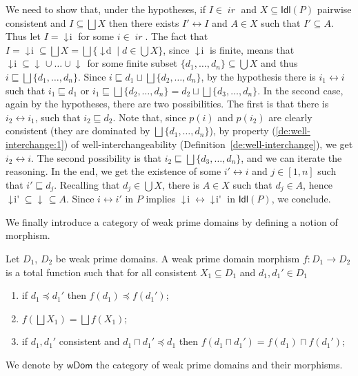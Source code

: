 \documentclass[conference]{IEEEtran}
\renewenvironment{proof}{\begin{IEEEproof}}{\end{IEEEproof}}
\newcommand{\principal}[1]{\ensuremath{\mathop{\downarrow\!{#1}}}}
\newcommand{\ideal}[1]{\ensuremath{\mathsf{Idl}({#1})}}
\newcommand{\ir}[1]{\ensuremath{\mathop{\mathit{ir}({#1})}}}
\newcommand{\pred}[1]{\ensuremath{\mathit{p}({#1})}}
\newcommand{\WDom}{\ensuremath{\mathsf{wDom}}}
\newcommand{\interval}[2][1]{\ensuremath{[{#1},{#2}]}}
\begin{document}
\begin{proof}
  
  We need to show that, under the hypotheses, if
  $I \in \ir{\ideal{P}}$ and $X \subseteq \ideal{P}$ pairwise
  consistent and $I \subseteq \bigsqcup X$ then there exists
  $I' \leftrightarrow I$ and $A \in X$ such that $I' \subseteq
  A$. Thus let $I = \principal{i}$ for some $i \in \ir{P}$. The fact
  that
  $I = \principal{i} \subseteq \bigsqcup X = \bigsqcup \{
  \principal{d} \mid d \in \bigcup X \}$, since $\principal{i}$ is
  finite, means that
  $\principal{i} \subseteq \principal{d_1} \cup \ldots \cup
  \principal{d_n}$ for some finite subset
  $\{ d_1, \ldots, d_n \} \subseteq \bigcup X$ and thus
  $i \sqsubseteq \bigsqcup \{ d_1, \ldots, d_n \}$. Since
  $i \sqsubseteq d_1 \sqcup \bigsqcup \{ d_2, \ldots, d_n\}$, by the
  hypothesis there is $i_1 \leftrightarrow i$ such that
  $i_1 \sqsubseteq d_1$ or
  $i_1 \sqsubseteq \bigsqcup \{ d_2, \ldots, d_n\} = d_2 \sqcup
  \bigsqcup \{ d_3, \ldots, d_n\}$.
  In the second case, again by the hypotheses, there are two
  possibilities. The first is that there is $i_2 \leftrightarrow i_1$,
  such that $i_2 \sqsubseteq d_2$. Note that, since $\pred{i}$ and
  $\pred{i_2}$ are clearly consistent (they are dominated by
  $\bigsqcup \{ d_1, \ldots, d_n \}$), by property
  (\ref{de:well-interchange:1}) of well-interchangeability
  (Definition~\ref{de:well-interchange}), we get
  $i_2 \leftrightarrow i$.
  The second possibility is that
  ${i_2} \sqsubseteq \bigsqcup \{ d_3, \ldots, d_n\}$, and we can iterate the reasoning. 
  In the end, we get the existence of some
  $i' \leftrightarrow i$ and $j \in \interval{n}$ such that
  $i' \sqsubseteq d_j$. Recalling that $d_j \in \bigcup X$, there is
  ${A} \in X$ such that $d_j \in {A}$, hence
  $\principal{{i'}} \subseteq \principal{d_j} \subseteq
  {A}$. Since $i \leftrightarrow {i'}$ in $P$ implies
    $\principal{i} \leftrightarrow \principal{{i'}}$ in $\ideal{P}$,
    we conclude.
\end{proof}



We finally introduce a category of weak prime domains by defining a notion of morphism.

\begin{definition}
  \label{de:domain-category}
  Let $D_1$, $D_2$ be weak prime domains.
  A  weak prime domain morphism $f : D_1 \to D_2$ is a total function such that
  for all consistent $X_1 \subseteq D_1$ and $d_1, d_1' \in D_1$
  \begin{enumerate}
  \item if $d_1 \preceq d_1'$ then $f(d_1) \preceq f(d_1')$;
  \item $f(\bigsqcup X_1) = \bigsqcup f(X_1)$;
  \item if $d_1, d_1'$ consistent and
    $d_1 \sqcap d_1' \preceq d_1$ then
    $f(d_1 \sqcap d_1') = f(d_1) \sqcap f(d_1')$;
  \end{enumerate}
  We denote by $\WDom$ the category of weak prime domains
  and their morphisms.
\end{definition}
\end{document}
